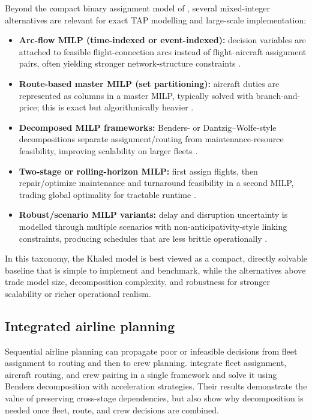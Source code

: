 Beyond the compact binary assignment model of \citet{khaled2018compact},
several mixed-integer alternatives are relevant for exact TAP modelling and
large-scale implementation:
\begin{itemize}
	\item \textbf{Arc-flow MILP (time-indexed or event-indexed):} decision
	variables are attached to feasible flight-connection arcs instead of flight--aircraft
	assignment pairs, often yielding stronger network-structure constraints
	\citep{levin1971scheduling, hane1995fleet, sherali2006airline}.
	\item \textbf{Route-based master MILP (set partitioning):} aircraft duties are
	represented as columns in a master MILP, typically solved with
	branch-and-price; this is exact but algorithmically heavier
	\citep{barnhart1998flight, sarac2006branch, klabjan2005large}.
	\item \textbf{Decomposed MILP frameworks:} Benders- or
	Dantzig--Wolfe-style decompositions separate assignment/routing from
	maintenance-resource feasibility, improving scalability on larger fleets
	\citep{cordeau2001benders, mercier2005computational, desaulniers1997daily}.
	\item \textbf{Two-stage or rolling-horizon MILP:} first assign flights, then
	repair/optimize maintenance and turnaround feasibility in a second MILP,
	trading global optimality for tractable runtime
	\citep{clarke1996maintenance, liang2011new, liang2012network}.
	\item \textbf{Robust/scenario MILP variants:} delay and disruption uncertainty
	is modelled through multiple scenarios with non-anticipativity-style linking
	constraints, producing schedules that are less brittle operationally
	\citep{borndorfer2010robust, froyland2013recoverable}.
\end{itemize}

In this taxonomy, the Khaled model is best viewed as a compact, directly
solvable baseline that is simple to implement and benchmark, while the
alternatives above trade model size, decomposition complexity, and robustness
for stronger scalability or richer operational realism.


\subsection{Integrated airline planning}

Sequential airline planning can propagate poor or infeasible decisions from
fleet assignment to routing and then to crew planning. \citet{shao2017integrated}
integrate fleet assignment, aircraft routing, and crew pairing in a single
framework and solve it using Benders decomposition with acceleration
strategies. Their results demonstrate the value of preserving cross-stage
dependencies, but also show why decomposition is needed once fleet, route, and
crew decisions are combined.


